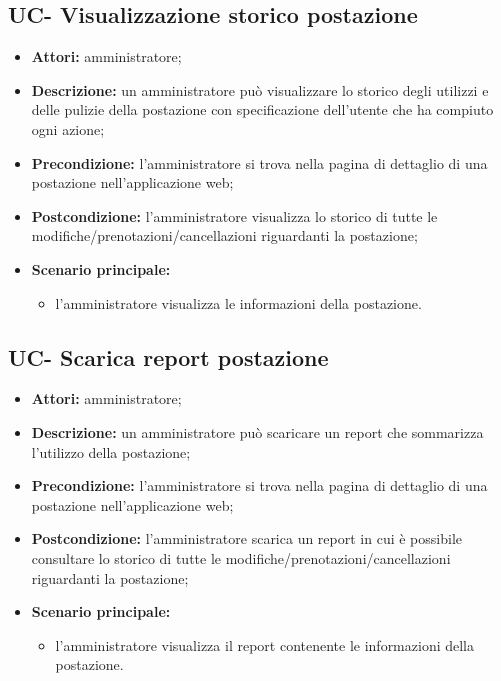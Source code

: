 \subsection{UC- Visualizzazione storico postazione}
\begin{itemize}
    \item \textbf{Attori:} amministratore;
    \item \textbf{Descrizione:} un amministratore pu\`{o} visualizzare lo storico degli utilizzi e delle pulizie della postazione con specificazione dell'utente che ha compiuto ogni azione;
    \item \textbf{Precondizione:} l'amministratore si trova nella pagina di dettaglio di una postazione nell'applicazione web;
    \item \textbf{Postcondizione:} l'amministratore visualizza lo storico di tutte le modifiche/prenotazioni/cancellazioni riguardanti la postazione;
    \item \textbf{Scenario principale:}
    \begin{itemize}
        \item l'amministratore visualizza le informazioni della postazione.
    \end{itemize}
\end{itemize}

\subsection{UC- Scarica report postazione}
\begin{itemize}
    \item \textbf{Attori:} amministratore;
    \item \textbf{Descrizione:} un amministratore pu\`{o} scaricare un report che sommarizza l'utilizzo della postazione;
    \item \textbf{Precondizione:} l'amministratore si trova nella pagina di dettaglio di una postazione nell'applicazione web;
    \item \textbf{Postcondizione:} l'amministratore scarica un report in cui \`{e} possibile consultare lo storico di tutte le modifiche/prenotazioni/cancellazioni riguardanti la postazione;
    \item \textbf{Scenario principale:}
    \begin{itemize}
        \item l'amministratore visualizza il report contenente le informazioni della postazione.
    \end{itemize}
\end{itemize}